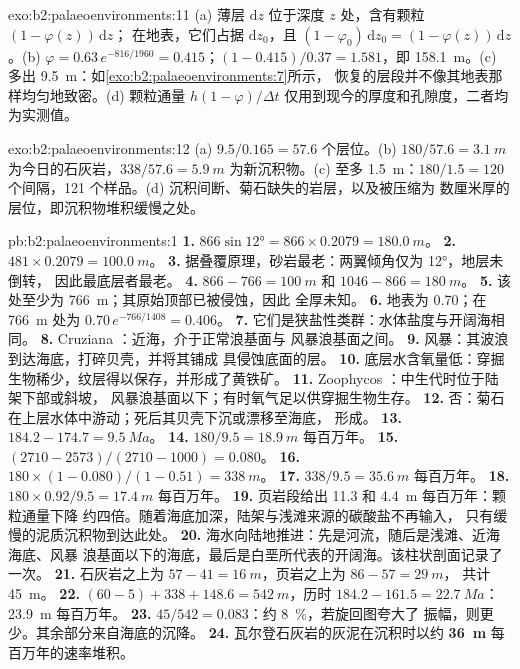 \begin{solution}{exo:b2:palaeoenvironments:11}
(a) 薄层 $\mathrm dz$ 位于深度 $z$ 处，含有颗粒 $(1 - \varphi(z))\,\mathrm dz$；
在地表，它们占据 $\mathrm dz_0$，且 $(1 - \varphi_0)\,\mathrm dz_0 = (1 -
\varphi(z))\,\mathrm dz$。(b) $\varphi = 0.63\,e^{-816/1960} = 0.415$；$(1 - 0.415)/0.37 =
1.581$，即 \qty{158.1}{m}。(c) 多出 \qty{9.5}{m}：如\cref{exo:b2:palaeoenvironments:7}所示，
恢复的层段并不像其地表那样均匀地致密。(d) 颗粒通量
$h(1-\varphi)/\Delta t$ 仅用到现今的厚度和孔隙度，二者均为实测值。
\end{solution}

\begin{solution}{exo:b2:palaeoenvironments:12}
(a) $9.5/0.165 = 57.6$ 个层位。(b) $180/57.6 = \qty{3.1}{m}$ 为今日的石灰岩，$338/57.6 =
\qty{5.9}{m}$ 为新沉积物。(c) 至多 \qty{1.5}{m}：$180/1.5 = 120$ 个间隔，121
个样品。(d) 沉积间断、菊石缺失的岩层，以及被压缩为
数厘米厚的层位，即沉积物堆积缓慢之处。
\end{solution}

\begin{solution}{pb:b2:palaeoenvironments:1}
\textbf{1.} $866 \sin \ang{12} = 866 \times 0.2079 = \qty{180.0}{m}$。
\textbf{2.} $481 \times 0.2079 = \qty{100.0}{m}$。
\textbf{3.} 据叠覆原理，砂岩最老：两翼倾角仅为 \ang{12}，地层未倒转，
因此最底层者最老。
\textbf{4.} $866 - 766 = \qty{100}{m}$ 和 $1046 - 866 = \qty{180}{m}$。
\textbf{5.} 该处至少为 \qty{766}{m}；其原始顶部已被侵蚀，因此
全厚未知。
\textbf{6.} 地表为 0.70；在 \qty{766}{m} 处为 $0.70\,e^{-766/1408} = 0.406$。
\textbf{7.} 它们是狭盐性类群：水体盐度与开阔海相同。
\textbf{8.} Cruziana ：近海，介于正常浪基面与
风暴浪基面之间。
\textbf{9.} 风暴：其波浪到达海底，打碎贝壳，并将其铺成
具侵蚀底面的层。
\textbf{10.} 底层水含氧量低：穿掘生物稀少，纹层得以保存，并形成了黄铁矿。
\textbf{11.} Zoophycos ：中生代时位于陆架下部或斜坡，
风暴浪基面以下；有时氧气足以供穿掘生物生存。
\textbf{12.} 否：菊石在上层水体中游动；死后其贝壳下沉或漂移至海底，
形成。
\textbf{13.} $184.2 - 174.7 = \qty{9.5}{Ma}$。
\textbf{14.} $180/9.5 = \qty{18.9}{m}$ 每百万年。
\textbf{15.} $(2710 - 2573)/(2710 - 1000) = 0.080$。
\textbf{16.} $180 \times (1 - 0.080)/(1 - 0.51) = \qty{338}{m}$。
\textbf{17.} $338/9.5 = \qty{35.6}{m}$ 每百万年。
\textbf{18.} $180 \times 0.92/9.5 = \qty{17.4}{m}$ 每百万年。
\textbf{19.} 页岩段给出 11.3 和 \qty{4.4}{m} 每百万年：颗粒通量下降
约四倍。随着海底加深，陆架与浅滩来源的碳酸盐不再输入，
只有缓慢的泥质沉积物到达此处。
\textbf{20.} 海水向陆地推进：先是河流，随后是浅滩、近海海底、风暴
浪基面以下的海底，最后是白垩所代表的开阔海。该柱状剖面记录了一次。
\textbf{21.} 石灰岩之上为 $57 - 41 = \qty{16}{m}$，页岩之上为 $86 - 57 = \qty{29}{m}$，
共计 \qty{45}{m}。
\textbf{22.} $(60 - 5) + 338 + 148.6 = \qty{542}{m}$，历时 $184.2 - 161.5 = \qty{22.7}{Ma}$：
\qty{23.9}{m} 每百万年。
\textbf{23.} $45/542 = 0.083$：约 \qty{8}{\percent}，若旋回图夸大了
振幅，则更少。其余部分来自海底的沉降。
\textbf{24.} 瓦尔登石灰岩的灰泥在沉积时以约
\textbf{\qty[text-series-to-math=true]{36}{m}} 每百万年的速率堆积。
\end{solution}
